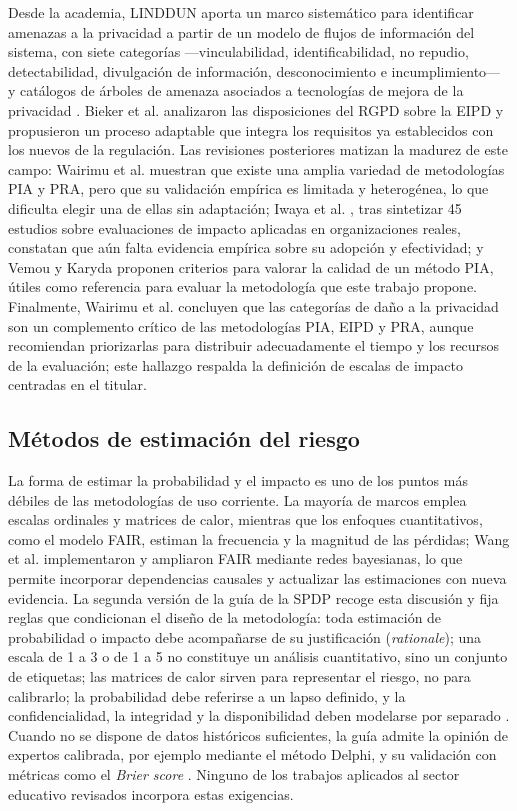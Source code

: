 Desde la academia, LINDDUN aporta un marco sistemático para identificar amenazas a la privacidad a partir de un modelo de flujos de información del sistema, con siete categorías ---vinculabilidad, identificabilidad, no repudio, detectabilidad, divulgación de información, desconocimiento e incumplimiento--- y catálogos de árboles de amenaza asociados a tecnologías de mejora de la privacidad \cite{deng2011linddun}. Bieker et al. \cite{bieker2016process} analizaron las disposiciones del RGPD sobre la EIPD y propusieron un proceso adaptable que integra los requisitos ya establecidos con los nuevos de la regulación. Las revisiones posteriores matizan la madurez de este campo: Wairimu et al. \cite{wairimu2024evaluation} muestran que existe una amplia variedad de metodologías PIA y PRA, pero que su validación empírica es limitada y heterogénea, lo que dificulta elegir una de ellas sin adaptación; Iwaya et al. \cite{iwaya2024wild}, tras sintetizar 45 estudios sobre evaluaciones de impacto aplicadas en organizaciones reales, constatan que aún falta evidencia empírica sobre su adopción y efectividad; y Vemou y Karyda \cite{vemou2020evaluating} proponen criterios para valorar la calidad de un método PIA, útiles como referencia para evaluar la metodología que este trabajo propone. Finalmente, Wairimu et al. \cite{wairimu2025harm} concluyen que las categorías de daño a la privacidad son un complemento crítico de las metodologías PIA, EIPD y PRA, aunque recomiendan priorizarlas para distribuir adecuadamente el tiempo y los recursos de la evaluación; este hallazgo respalda la definición de escalas de impacto centradas en el titular.

\subsection{Métodos de estimación del riesgo}

La forma de estimar la probabilidad y el impacto es uno de los puntos más débiles de las metodologías de uso corriente. La mayoría de marcos emplea escalas ordinales y matrices de calor, mientras que los enfoques cuantitativos, como el modelo FAIR, estiman la frecuencia y la magnitud de las pérdidas; Wang et al. \cite{wang2020fair} implementaron y ampliaron FAIR mediante redes bayesianas, lo que permite incorporar dependencias causales y actualizar las estimaciones con nueva evidencia. La segunda versión de la guía de la SPDP recoge esta discusión y fija reglas que condicionan el diseño de la metodología: toda estimación de probabilidad o impacto debe acompañarse de su justificación (\textit{rationale}); una escala de 1 a 3 o de 1 a 5 no constituye un análisis cuantitativo, sino un conjunto de etiquetas; las matrices de calor sirven para representar el riesgo, no para calibrarlo; la probabilidad debe referirse a un lapso definido, y la confidencialidad, la integridad y la disponibilidad deben modelarse por separado \cite{spdp2026guiav2}. Cuando no se dispone de datos históricos suficientes, la guía admite la opinión de expertos calibrada, por ejemplo mediante el método Delphi, y su validación con métricas como el \textit{Brier score} \cite{spdp2026guiav2}. Ninguno de los trabajos aplicados al sector educativo revisados incorpora estas exigencias.

